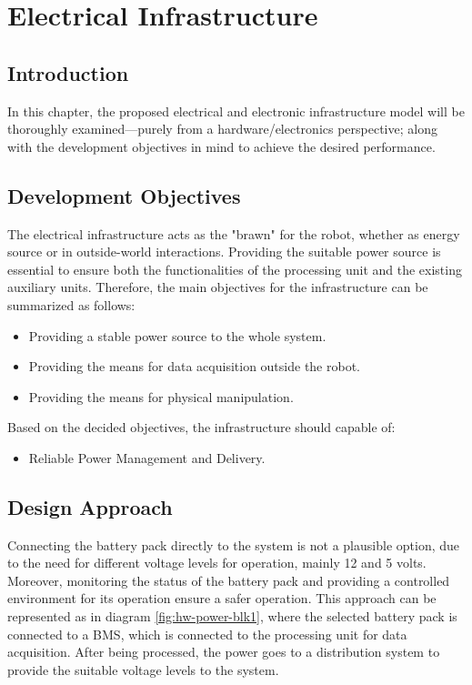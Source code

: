 
\chapter{Electrical Infrastructure}

\section{Introduction}
\vspace{-2mm}
In this chapter, the proposed electrical and electronic infrastructure model will be thoroughly examined---purely from a hardware/electronics perspective; along with the development objectives in mind to achieve the desired performance.

\section{Development Objectives}
The electrical infrastructure acts as the "brawn" for the robot, whether as energy source or in outside-world interactions. Providing the suitable power source is essential to ensure both the functionalities of the processing unit and the existing auxiliary units. Therefore, the main objectives for the infrastructure can be summarized as follows:
\begin{itemize}
    \item Providing a stable power source to the whole system.
    \item Providing the means for data acquisition outside the robot.
    \item Providing the means for physical manipulation.
\end{itemize}
Based on the decided objectives, the infrastructure should capable of:
\begin{itemize}
    \item Reliable Power Management and Delivery. 
\end{itemize}

\vspace{-1mm}
\section{Design Approach}\label{sect:d_approach}
Connecting the battery pack directly to the system is not a plausible option, due to the need for different voltage levels for operation, mainly 12 and 5 volts. Moreover, monitoring the status of the battery pack and providing a controlled environment for its operation ensure a safer operation.
\newline This approach can be represented as in diagram \ref{fig:hw-power-blk1}, where the selected battery pack is connected to a BMS, which is connected to the processing unit for data acquisition. After being processed, the power goes to a distribution system to provide the suitable voltage levels to the system. 


